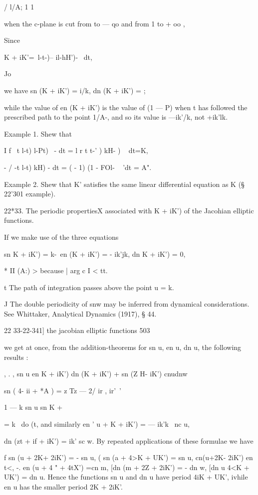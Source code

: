 / l/A; 1 1

when the c-plane is cut from to — qo and from 1 to + oo ,

Since

K + iK'=\ l-t-)-- il-hH')- ~dt,

Jo

we have sn (K + iK') = i/k, dn (K + iK') = ;

while the value of en (K + iK') is the value of (1 — P) when t has
followed the prescribed path to the point 1/A-, and so its value is
—ik'/k, not +ik'lk.

Example 1. Shew that

I f \ t l-t) l-Pt) ~- dt = l r t t-' ) kH- ) ~ dt=K,

- / -t l-t) kH) - dt = ( - 1) (1 - FOl- ~ 'dt = A".

Example 2. Shew that K' satisfies the same linear differential
equation as K (§ 22'301 example).

22*33. The periodic propertiesX associated with K + iK') of the
Jacohian elliptic functions.

If we make use of the three equations

sn K + iK') = k-\ en (K + iK') = - ik'jk, dn K + iK') = 0,

* II (A:) > because | arg c I < tt.

t The path of integration passes above the point u = k.

J The double periodicity of snw may be inferred from dynamical
considerations. See Whittaker, Analytical Dynamics (1917), § 44.

22 33-22-341] the jacobian elliptic functions 503

we get at once, from the addition-theorems for sn u, en u, dn u, the
following results :

, . , sn u en K + iK') dn (K + iK') + sn (Z H- iK') cnudnw

sn ( 4- ii + *A ) = z Tz — 2/ ir , ir'\ '

  1 — k sn u sn K +%

= k~ do (t, and similarly en ' u + K + iK') = — ik'k~ nc u,

dn (zt + if + iK') = ik' sc w. By repeated applications of these
formulae we have

f sn (u + 2K+ 2iK') = - sn u, ( sn (a + 4>K + UK') = sn u, cn(u+2K-
2iK') en t<, -. en (u + 4 " + 4tX') =cn m, [dn (m + 2Z + 2iK') = - dn
w, [dn u 4<K + UK') = dn u. Hence the functions sn u and dn u have
period 4iK + UK', ivhile en u has the smaller period 2K + 2iK'.

